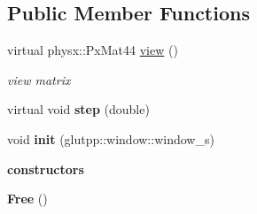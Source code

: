 \subsection*{\-Public \-Member \-Functions}
\begin{DoxyCompactItemize}
\item 
\hypertarget{classglutpp_1_1Camera_1_1View_1_1Free_a5f1648d4c0ad2289dd9e78f0b68b8a6c}{virtual physx\-::\-Px\-Mat44 \hyperlink{classglutpp_1_1Camera_1_1View_1_1Free_a5f1648d4c0ad2289dd9e78f0b68b8a6c}{view} ()}\label{classglutpp_1_1Camera_1_1View_1_1Free_a5f1648d4c0ad2289dd9e78f0b68b8a6c}

\begin{DoxyCompactList}\small\item\em view matrix \end{DoxyCompactList}\item 
\hypertarget{classglutpp_1_1Camera_1_1View_1_1Free_a2a117540633d55517305fa69cee5f336}{virtual void {\bfseries step} (double)}\label{classglutpp_1_1Camera_1_1View_1_1Free_a2a117540633d55517305fa69cee5f336}

\item 
\hypertarget{classglutpp_1_1Camera_1_1View_1_1Free_a393fcaeafad6d09a4a6ec28800ac9706}{void {\bfseries init} (glutpp\-::window\-::window\-\_\-s)}\label{classglutpp_1_1Camera_1_1View_1_1Free_a393fcaeafad6d09a4a6ec28800ac9706}

\end{DoxyCompactItemize}
\begin{Indent}{\bf constructors}\par
\begin{DoxyCompactItemize}
\item 
\hypertarget{classglutpp_1_1Camera_1_1View_1_1Free_a3038c31e5a7a43d6dbf2d286e24d91c9}{{\bfseries \-Free} ()}\label{classglutpp_1_1Camera_1_1View_1_1Free_a3038c31e5a7a43d6dbf2d286e24d91c9}

\end{DoxyCompactItemize}
\end{Indent}

